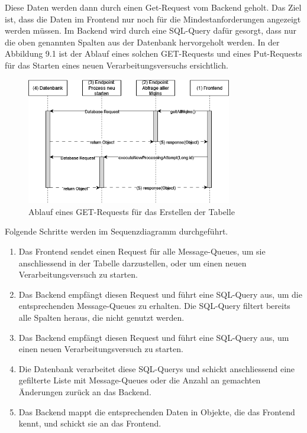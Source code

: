 \newpage
Diese Daten werden dann durch einen Get-Request vom Backend geholt. Das Ziel ist, dass die Daten im Frontend nur noch für die Mindestanforderungen angezeigt werden müssen. Im Backend wird durch eine SQL-Query dafür gesorgt, dass nur die oben genannten Spalten aus der Datenbank hervorgeholt werden. In der Abbildung 9.1 ist der Ablauf eines solchen GET-Requests und eines Put-Requests für das Starten eines neuen Verarbeitungsversuchs ersichtlich.

\begin{figure}[H]
	\begin{center}
		\includegraphics[width=0.8\textwidth]{ressourcen/Sequenzdiagramm}
		\caption[Ablauf eines GET-Requests für das Erstellen der Tabelle]{Ablauf eines GET-Requests für das Erstellen der Tabelle}\label{fig:get-request-for-creation-of-table}
	\end{center}
\end{figure}

Folgende Schritte werden im Sequenzdiagramm durchgeführt.
\begin{enumerate}
	\item Das Frontend sendet einen Request für alle Message-Queues, um sie anschliessend in der Tabelle darzustellen, oder um einen neuen Verarbeitungsversuch zu starten.
	\item Das Backend empfängt diesen Request und führt eine SQL-Query aus, um die entsprechenden Message-Queues zu erhalten. Die SQL-Query filtert bereits alle Spalten heraus, die nicht genutzt werden.
	\item Das Backend empfängt diesen Request und führt eine SQL-Query aus, um einen neuen Verarbeitungsversuch zu starten.
	\item Die Datenbank verarbeitet diese SQL-Querys und schickt anschliessend eine gefilterte Liste mit Message-Queues oder die Anzahl an gemachten Änderungen zurück an das Backend.
	\item Das Backend mappt die entsprechenden Daten in Objekte, die das Frontend kennt, und schickt sie an das Frontend.
\end{enumerate}

